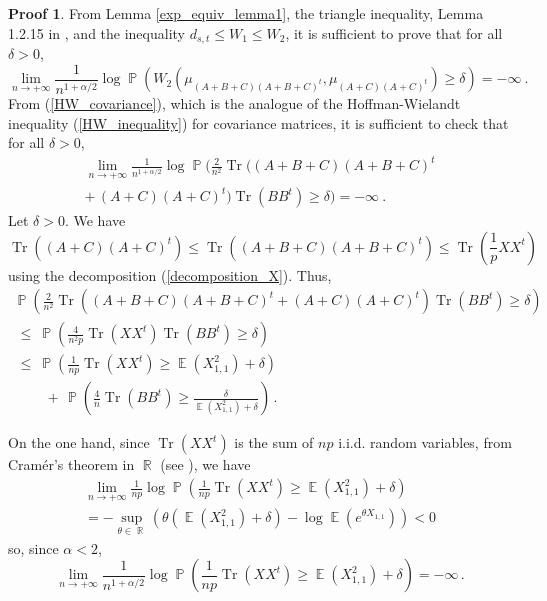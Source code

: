 \documentclass[11pt,a4paper]{article}
\DeclareMathOperator{\E}{\mathbb{E}}
\DeclareMathOperator{\R}{\mathbb{R}}
\DeclareMathOperator{\PR}{\mathbb{P}}
\DeclareMathOperator{\1}{\mathbf{1}}
\DeclareMathOperator{\Tr}{\mathrm{Tr}}
\theoremstyle{definition}
\newtheorem*{Proof}{Proof}
\begin{document}
\begin{Proof}
From Lemma \ref{exp_equiv_lemma1}, the triangle inequality, Lemma 1.2.15 in \cite{DZ}, and the inequality $d_{s,t} \le W_1 \le W_2$, it is sufficient to prove that for all $\delta>0$,
\begin{displaymath}
\lim_{n \to +\infty} \frac{1}{n^{1+\alpha/2}} \log \PR \left( W_2 \left( \mu_{(A+B+C)(A+B+C)^t} , \mu_{(A+C)(A+C)^t} \right) \ge \delta \right) = -\infty \ .
\end{displaymath}
From (\ref{HW_covariance}), which is the analogue of the Hoffman-Wielandt inequality (\ref{HW_inequality}) for covariance matrices, it is sufficient to check that for all $\delta>0$,
\begin{multline*}
\lim_{n \to +\infty} \frac{1}{n^{1+\alpha/2}} \log \PR \Bigg( \frac{2}{n^2} \Tr((A+B+C)(A+B+C)^t \\
+ \, (A+C)(A+C)^t) \Tr(BB^t) \ge \delta \Bigg) = -\infty \ .
\end{multline*}
Let $\delta>0$. We have
\begin{displaymath}
\Tr((A+C)(A+C)^t) \le \Tr((A+B+C)(A+B+C)^t) \le \Tr \left( \frac1p XX^t \right)
\end{displaymath}
using the decomposition (\ref{decomposition_X}). Thus,
\begin{equation} \label{exp_equiv_eq1}
\begin{array}{l}
\displaystyle{   \PR \left( \frac{2}{n^2} \Tr((A+B+C)(A+B+C)^t + (A+C)(A+C)^t) \Tr(BB^t) \ge \delta \right)   } \\
\displaystyle{   \ \le \ \PR \left( \frac{4}{n^2p} \Tr(XX^t) \Tr(BB^t) \ge \delta \right)   } \\
\displaystyle{   \ \le \ \PR \left( \frac{1}{np} \Tr(XX^t) \ge \E(X_{1,1}^2) + \delta \right)   } \\
\displaystyle{   \ \qquad + \, \PR \left( \frac4n \Tr(BB^t) \ge \frac{\delta}{\E(X_{1,1}^2) + \delta} \right)   } \, .
\end{array}
\end{equation}

On the one hand, since $\Tr(XX^t)$ is the sum of $np$ i.i.d. random variables, from Cram\'er's theorem in $\R$ (see \cite[Theorem 2.2.3]{DZ}), we have
\begin{multline*}
\lim_{n \to +\infty} \frac{1}{np} \log \PR \left( \frac{1}{np} \Tr(XX^t) \ge \E(X_{1,1}^2) + \delta \right) \\
= -\sup_{\theta \in \R} \left( \theta(\E(X_{1,1}^2) + \delta) - \log \E(e^{\theta X_{1,1}}) \right) <0
\end{multline*}
so, since $\alpha<2$,
\begin{equation} \label{exp_equiv_eq2}
\lim_{n \to +\infty} \frac{1}{n^{1+\alpha/2}} \log \PR \left( \frac{1}{np} \Tr(XX^t) \ge \E(X_{1,1}^2) + \delta \right) = -\infty \, .
\end{equation}


\end{Proof}
\end{document}
